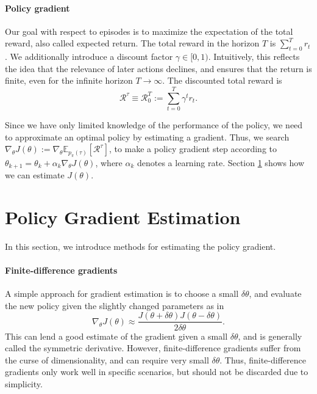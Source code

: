 \documentclass[final]{IEEEtran}
\begin{document}
\paragraph{Policy gradient} 
Our goal with respect to episodes is to maximize the expectation of the total reward, also called expected return. 
The total reward in the horizon $T$ is $\sum_{t=0}^{T} r_{t}$. 
We additionally introduce a discount factor $\gamma \in [0,1)$.
Intuitively, this reflects the idea that the relevance of later actions declines, and ensures that the return is finite, even for the infinite horizon $T \to \infty$. 
The discounted total reward is 
\begin{equation}
  \mathcal{R}^\tau \equiv \mathcal{R}_0^T := \sum_{t=0}^{T} \gamma^t r_t.
  \label{eqn:acc-reward}
\end{equation}

Since we have only limited knowledge of the performance of the policy, we need to approximate an optimal policy by estimating a gradient. 
Thus, we search $\nabla_\theta J(\theta) := \nabla_\theta \mathbb{E}_{p_\pi(\tau)}\left[\mathcal{R}^\tau\right]$, to make a policy gradient step according to $\theta_{k+1} = \theta_k + \alpha_k \nabla_\theta J(\theta)$, where $\alpha_k$ denotes a learning rate. 
Section \ref{sec:pge} shows how we can estimate $J(\theta)$.

\section{Policy Gradient Estimation}
\label{sec:pge}

In this section, we introduce methods for estimating the policy gradient.

\paragraph{Finite-difference gradients} 
A simple approach for gradient estimation is to choose a small $\delta\theta$, and evaluate the new policy given the slightly changed parameters as in 
\begin{equation}
	\nabla_\theta J(\theta) \approx \frac{J(\theta+\delta\theta)J(\theta-\delta\theta)}{2\delta\theta}.
\end{equation} 
This can lend a good estimate of the gradient given a small $\delta \theta$, and is generally called the symmetric derivative. 
However, finite-difference gradients suffer from the curse of dimensionality, and can require very small $\delta\theta$.
Thus, finite-difference gradients only work well in specific scenarios, but should not be discarded due to simplicity.
\end{document}
